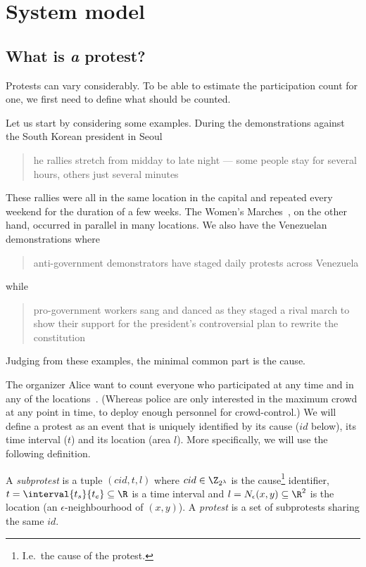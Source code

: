\section{System model}%
\label{SystemModel}

\subsection{What is \protect\emph{a} protest?}%
\label{WhatIsAProtest}

Protests can vary considerably.
To be able to estimate the participation count for one, we first need to define
what should be counted.

Let us start by considering some examples.
During the demonstrations against the South Korean president in Seoul
\blockcquote{2016DemonstrationsInSeoul}{%
  he rallies stretch from midday to late night --- some 
  people stay for several hours, others just several minutes%
}.
These rallies were all in the same location in the capital and repeated every 
weekend for the duration of a few weeks.
The Women's Marches~\cite{2017WomensMarchesInUS}, on the other hand, occurred 
in parallel in many locations.
We also have the Venezuelan demonstrations where
\blockcquote{2017VenezuelaProtestFrequency}{%
  anti-government demonstrators have staged daily protests across Venezuela%
} while
\blockcquote{AlJazeeraOnVenezuela2017}{%
  pro-government workers sang and danced as they staged a rival march to show 
  their support for the president's controversial plan to rewrite the 
  constitution%
}.
Judging from these examples, the minimal common part is the cause.%
\label{CauseIsTheCommonDenominator}

The organizer Alice want to count everyone who participated at any time and in 
any of the locations~\cite{2016DemonstrationsInSeoul}.
(Whereas police are only interested in the maximum crowd at any point in time, 
to deploy enough personnel for crowd-control.)
We will define a protest as an event that is uniquely identified by its cause 
(\(id\) below), its time interval (\(t\)) and its location (area \(l\)).
More specifically, we will use the following definition.

\begin{definition}[Protest]\label{DefProtest}
  A \emph{subprotest} is a tuple \((cid, t, l)\) where
  \(cid\in \Z_{2^\lambda}\) is the cause\footnote{%
    I.e.\ the cause of the protest.
  } identifier,
  \(t = \interval{t_s}{t_e}\subseteq \R\) is a time interval and
  \(l = N_\epsilon(x, y)\subseteq \R^2\) is the location (an 
  \(\epsilon\)-neighbourhood of \((x,y)\)).
  A \emph{protest} is a set of subprotests sharing the same \(id\).
\end{definition}

